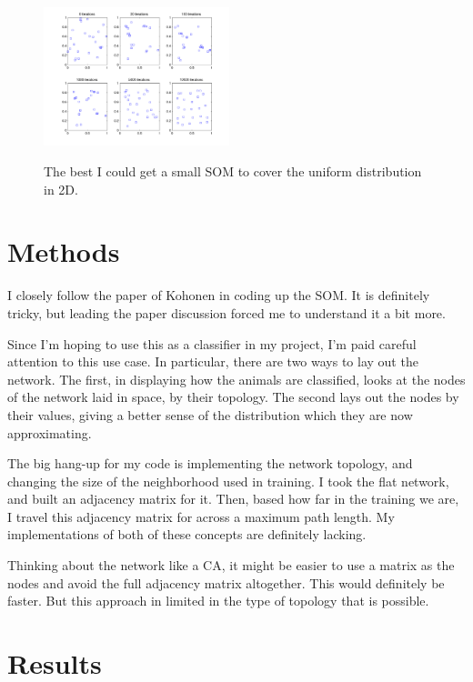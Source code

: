 \documentclass[pre,twocolumn,twoside,byrevtex,superscriptaddress]{revtex4}
\begin{document}
\begin{figure}
 \centering
  \includegraphics[width=0.48\textwidth]{figures/SOM_uniform_dist_covering_long_corrected.png}
  \label{fig:2}
  \caption{The best I could get a small SOM to cover the uniform distribution in 2D.}
\end{figure}

\section{Methods}

I closely follow the paper of Kohonen in coding up the SOM.
It is definitely tricky, but leading the paper discussion forced me to understand it a bit more.

Since I'm hoping to use this as a classifier in my project, I'm paid careful attention to this use case.
In particular, there are two ways to lay out the network.
The first, in displaying how the animals are classified, looks at the nodes of the network laid in space, by their topology.
The second lays out the nodes by their values, giving a better sense of the distribution which they are now approximating.

The big hang-up for my code is implementing the network topology, and changing the size of the neighborhood used in training.
I took the flat network, and built an adjacency matrix for it.
Then, based how far in the training we are, I travel this adjacency matrix for across a maximum path length.
My implementations of both of these concepts are definitely lacking.

Thinking about the network like a CA, it might be easier to use a matrix as the nodes and avoid the full adjacency matrix altogether.
This would definitely be faster.
But this approach in limited in the type of topology that is possible.

\section{Results}
\end{document}
